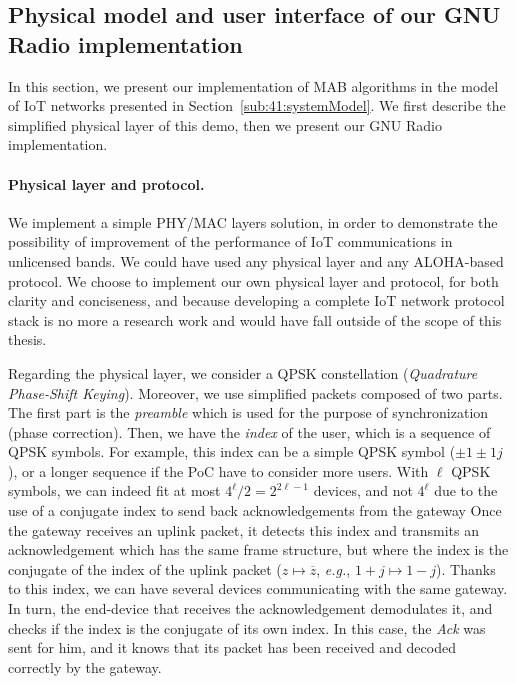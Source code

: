 

\subsection{Physical model and user interface of our GNU Radio implementation}
\label{sub:42:implementation}

In this section, we present our implementation of MAB algorithms in the model of IoT networks presented in Section~\ref{sub:41:systemModel}.
We first describe the simplified physical layer of this demo, then we present our GNU Radio implementation.


\paragraph{Physical layer and protocol.}

We implement a simple PHY/MAC layers solution, in order to demonstrate the possibility of improvement of the performance of IoT communications in unlicensed bands. We could have used any physical layer and any ALOHA-based protocol.
We choose to implement our own physical layer and protocol, for both clarity and conciseness, and because developing a complete IoT network protocol stack is no more a research work and would have fall outside of the scope of this thesis.

Regarding the physical layer, we consider a QPSK constellation (\emph{Quadrature Phase-Shift Keying}). Moreover, we use simplified packets composed of two parts.
The first part is the \emph{preamble} which is used for the purpose of synchronization (phase correction).
Then, we have the \emph{index} of the user, which is a sequence of QPSK symbols.
For example, this index can be a simple QPSK symbol ($\pm1\pm1j$), or a longer sequence if the PoC have to consider more users.
With $\ell$ QPSK symbols, we can indeed fit at most $4^{\ell}/2 = 2^{2\ell-1}$ devices, and not $4^{\ell}$ due to the use of a conjugate index to send back acknowledgements from the gateway
Once the gateway receives an uplink packet, it detects this index and transmits an acknowledgement which has the same frame structure, but where the index is the conjugate of the index of the uplink packet ($z \mapsto \overline{z}$, \emph{e.g.}, $1+j \mapsto 1-j$).
Thanks to this index, we can have several devices communicating with the same gateway.
%
In turn, the end-device that receives the acknowledgement demodulates it, and checks if the index is the conjugate of its own index.
In this case, the \emph{Ack} was sent for him, and it knows that its packet has been received and decoded correctly by the gateway.

